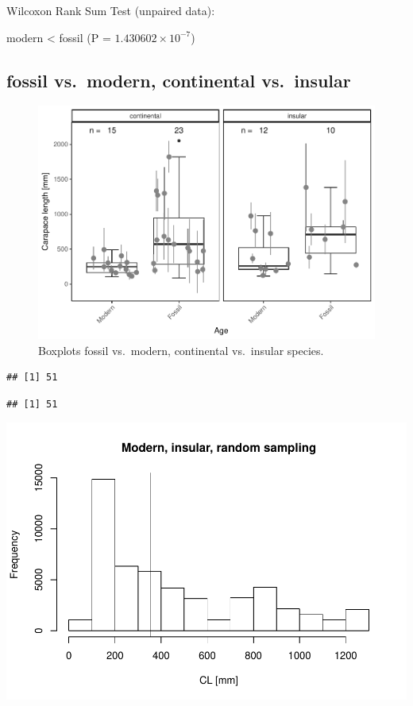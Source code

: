\documentclass[]{article}
\begin{document}
Wilcoxon Rank Sum Test (unpaired data):

modern \textless{} fossil (P = \(1.430602\times 10^{-7}\))

\newpage

\subsection{fossil vs.~modern, continental
vs.~insular}\label{fossil-vs.modern-continental-vs.insular}

\begin{figure}[htbp]
\centering
\includegraphics{MA_JJ_files/figure-latex/BPFMCI-1.pdf}
\caption{Boxplots fossil vs.~modern, continental vs.~insular species.}
\end{figure}

\begin{verbatim}
## [1] 51
\end{verbatim}

\begin{verbatim}
## [1] 51
\end{verbatim}

\includegraphics{MA_JJ_files/figure-latex/RSMFCI-1.pdf}
\end{document}

